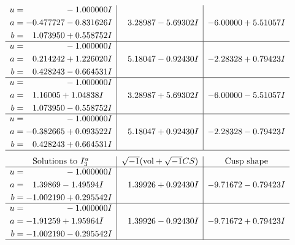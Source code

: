 \documentclass[1p]{elsarticle_modified}
\theoremstyle{definition}
\newcommand{\I}{\sqrt{-1}}
\begin{document}
$$\begin{array}{c|c|c}
\begin{aligned}
u &= \phantom{-0.000000 } -1.000000 I \\
a &= -0.477727 - 0.831626 I \\
b &= \phantom{-}1.073950 + 0.558752 I\end{aligned}
 & \phantom{-}3.28987 - 5.69302 I & -6.00000 + 5.51057 I \\ \hline\begin{aligned}
u &= \phantom{-0.000000 } -1.000000 I \\
a &= \phantom{-}0.214242 + 1.226020 I \\
b &= \phantom{-}0.428243 - 0.664531 I\end{aligned}
 & \phantom{-}5.18047 - 0.92430 I & -2.28328 + 0.79423 I \\ \hline\begin{aligned}
u &= \phantom{-0.000000 } -1.000000 I \\
a &= \phantom{-}1.16005 + 1.04838 I \\
b &= \phantom{-}1.073950 - 0.558752 I\end{aligned}
 & \phantom{-}3.28987 + 5.69302 I & -6.00000 - 5.51057 I \\ \hline\begin{aligned}
u &= \phantom{-0.000000 } -1.000000 I \\
a &= -0.382665 + 0.093522 I \\
b &= \phantom{-}0.428243 + 0.664531 I\end{aligned}
 & \phantom{-}5.18047 + 0.92430 I & -2.28328 - 0.79423 I\\
 \hline 
 \end{array}$$\newpage$$\begin{array}{c|c|c}  
\text{Solutions to }I^u_{3}& \I (\text{vol} + \sqrt{-1}CS) & \text{Cusp shape}\\
 \hline 
\begin{aligned}
u &= \phantom{-0.000000 } -1.000000 I \\
a &= \phantom{-}1.39869 - 1.49594 I \\
b &= -1.002190 + 0.295542 I\end{aligned}
 & \phantom{-}1.39926 + 0.92430 I & -9.71672 - 0.79423 I \\ \hline\begin{aligned}
u &= \phantom{-0.000000 } -1.000000 I \\
a &= -1.91259 + 1.95964 I \\
b &= -1.002190 - 0.295542 I\end{aligned}
 & \phantom{-}1.39926 - 0.92430 I & -9.71672 + 0.79423 I\\
 \hline 
 \end{array}$$\newpage\newpage\renewcommand{\arraystretch}{1}
\end{document}

